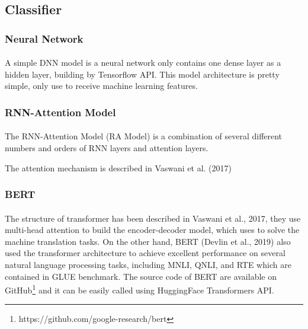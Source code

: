 \documentclass[12pt]{article}
\begin{document}
\begin{CJK*}{UTF8}{bkai}
\begin{spacing}{1.77}
\subsection{Classifier}

\subsubsection{Neural Network}
\paragraph{}
A simple DNN model is a neural network only contains one dense layer as a hidden layer, building by Tensorflow API. This model architecture is pretty simple, only use to receive machine learning features.

\subsubsection{RNN-Attention Model}
\paragraph{}
The RNN-Attention Model (RA Model) is a combination of several different numbers and orders of RNN layers and attention layers.

The attention mechanism is described in Vaswani et al. (2017)

\subsubsection{BERT}
\paragraph{}
The structure of transformer\cite{vaswani2017attention} has been described in Vaswani et al., 2017, they use multi-head attention to build the encoder-decoder model, which uses to solve the machine translation tasks. On the other hand, BERT\cite{devlin2018bert} (Devlin et al., 2019) also used the transformer architecture to achieve excellent performance on several natural language processing tasks, including MNLI, QNLI, and RTE which are contained in GLUE benchmark. The source code of BERT are available on GitHub\footnote{https://github.com/google-research/bert} and it can be easily called using HuggingFace Transformers API\cite{wolf-etal-2020-transformers}.


\end{spacing}
\end{CJK*}
\end{document}
